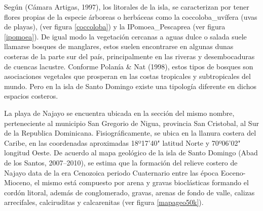 \documentclass[11pt,]{article}
\begin{document}
Según (Cámara Artigas, 1997), los litorales de la isla, se caracterizan
por tener flores propias de la especie árboreas o herbáceas como la
coccoloba\_uvífera (uvas de playas), (ver figura \ref{coccoloba}) y la
IPomoea\_Pescaprea (ver figura \ref{ipomoea}). De igual modo la
vegetación cercanas a aguas dulce o salada suele llamarse bosques de
manglares, estos suelen encontrarse en algunas dunas costeras de la
parte sur del país, principalmente en las riveras y desembocaduras de
cuencas lacustre. Conforme Polanía \& Nat (1998), estos tipos de bosques
son asociaciones vegetales que prosperan en las costas tropicales y
subtropicales del mundo. Pero en la isla de Santo Domingo existe una
tipología diferente en dichos espacios costeros.

La playa de Najayo se encuentra ubicada en la sección del mismo nombre,
perteneciente al municipio San Gregorio de Nigua, provincia San
Cristobal, al Sur de la Republica Dominicana. Fisiográficamente, se
ubica en la llanura costera del Caribe, en las coordenadas aproximadas
18º17'40" latitud Norte y 70º06'02" longitud Oeste. De acuerdo al mapa
geológico de la isla de Santo Domingo (Abad de los Santos, 2007--2010),
se estima que la formación del relieve costero de Najayo data de la era
Cenozoica periodo Cuaternario entre las época Eoceno-Mioceno, el mismo
está compuesto por arena y gravas bioclásticas formando el cordón
litoral, además de conglomerado, gravas, arenas de fondo de valle,
calizas arrecifales, calciruditas y calcarenitas (ver figura
\ref{mapageo50k}).
\end{document}
